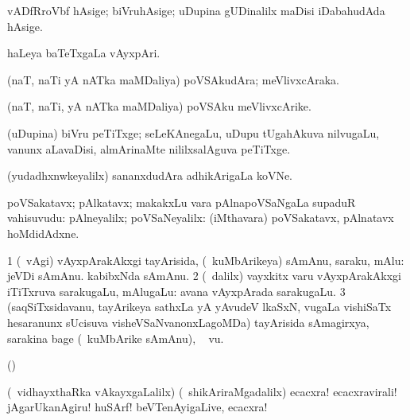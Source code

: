 {\bentry
{} 
\gl{\nA}
\expl{}
\bmng
vADfRroVbf hAsige; biVruhAsige; uDupina gUDinalilx maDisi iDabahudAda hAsige. 
\emng
\eentry

\bentry
{} 
\gl{\nA}
\expl{}
\bmng
haLeya baTeTxgaLa vAyxpAri. 
\emng
\eentry

\bentry
{} 
\gl{\nA}
\expl{}
\bmng
(naT, naTi yA nATka maMDaliya) poVSAkudAra; meVlivxcAraka. 
\emng
\eentry

\bentry
{} 
\gl{\nA}
\expl{}
\bmng
(naT, naTi, yA nATka maMDaliya) poVSAku meVlivxcArike. 
\emng
\eentry

\bentry
{} 
\gl{\nA}
\expl{}
\bmng
(uDupina) biVru peTiTxge; seLeKAnegaLu, uDupu tUgahAkuva nilvugaLu, \mo vanunx aLavaDisi, almArinaMte nililxsalAguva peTiTxge. 
\emng
\eentry

\bentry
{} 
\gl{\nA}
\expl{}
\bmng
(yudadhxnwkeyalilx) sananxdudAra adhikArigaLa koVNe. 
\emng
\eentry

\bentry
{} 
\gl{\nA}
\expl{}
\bmng
poVSakatavx; pAlkatavx; makakxLu \mo vara pAlnapoVSaNgaLa supaduR vahisuvudu:  pAlneyalilx; poVSaNeyalilx:  (iMthavara) poVSakatavx, pAlnatavx hoMdidAdxne. 
\emng
\eentry

\bentry
{} 
\gl{\nA}
\expl{}
\bmng
\bnum
\num{1} (\kanmu\ \saupa vAgi) vAyxpArakAkxgi tayArisida, (\kanmu\ kuMbArikeya) sAmAnu, saraku, mAlu:  jeVDi sAmAnu.  kabibxNda sAmAnu. 
\num{2} (\sA\ \bava dalilx) vayxkitx \mo varu vAyxpArakAkxgi iTiTxruva sarakugaLu, mAlugaLu:  avana vAyxpArada sarakugaLu. 
\num{3} (saqSiTxsidavanu, tayArikeya sathxLa yA yAvudeV lkaSxN, \mo vugaLa vishiSaTx hesaranunx sUcisuva visheVSaNvanonxLagoMDa) tayArisida sAmagirxya, sarakina bage (\kanmu\ kuMbArike sAmAnu), \udA\  \mo vu. 
\enum
\emng
\eentry

\bentry
{} 
\gl{\Agu}
\expl{}
\bmng
(\kAparx)  
\emng
\eentry

\bentry
{} 
\gl{\sakirx}
\expl{}
\bmng
(\kanmu\ vidhayxthaRka vAkayxgaLalilx) (\kanmu\ shikAriraMgadalilx) ecacxra! ecacxravirali! jAgarUkanAgiru! huSArf!  beVTenAyigaLive, ecacxra! 
\emng
\eentry

}
